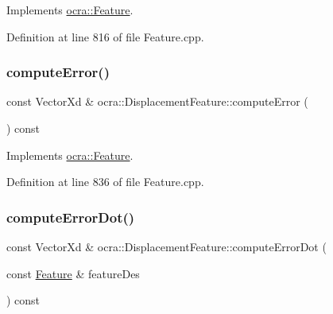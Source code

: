 Implements \hyperlink{classocra_1_1Feature_aaa74d6869f7e574fcc39d443581ddf77}{ocra\+::\+Feature}.



Definition at line 816 of file Feature.\+cpp.

\hypertarget{classocra_1_1DisplacementFeature_ac0520f1a870558227ba6d5339a243414}{}\label{classocra_1_1DisplacementFeature_ac0520f1a870558227ba6d5339a243414} 
\subsubsection{\texorpdfstring{compute\+Error()}{computeError()}\hspace{0.1cm}{\footnotesize\ttfamily [2/2]}}
{\footnotesize\ttfamily const Vector\+Xd \& ocra\+::\+Displacement\+Feature\+::compute\+Error (\begin{DoxyParamCaption}{ }\end{DoxyParamCaption}) const\hspace{0.3cm}{\ttfamily [virtual]}}



Implements \hyperlink{classocra_1_1Feature_a88f87b496aedc7bf9f13b19bb8f9c7fa}{ocra\+::\+Feature}.



Definition at line 836 of file Feature.\+cpp.

\hypertarget{classocra_1_1DisplacementFeature_afd5e272957274c46a6331c2a3d3324df}{}\label{classocra_1_1DisplacementFeature_afd5e272957274c46a6331c2a3d3324df} 
\subsubsection{\texorpdfstring{compute\+Error\+Dot()}{computeErrorDot()}\hspace{0.1cm}{\footnotesize\ttfamily [1/2]}}
{\footnotesize\ttfamily const Vector\+Xd \& ocra\+::\+Displacement\+Feature\+::compute\+Error\+Dot (\begin{DoxyParamCaption}\item[{const \hyperlink{classocra_1_1Feature}{Feature} \&}]{feature\+Des }\end{DoxyParamCaption}) const\hspace{0.3cm}{\ttfamily [virtual]}}



